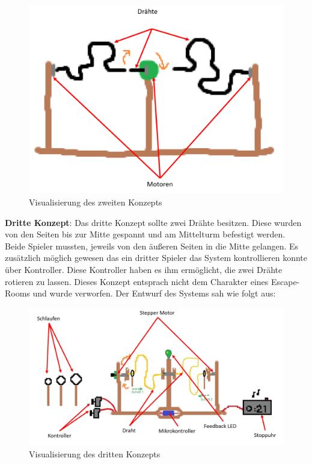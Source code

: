 \begin{figure}[H]
 \centerline{\includegraphics[width=\textwidth,scale=1]{./images/Konzeptpapier_2.png}}
 \caption{Visualisierung des zweiten Konzepts}\label{imageLabel}
\end{figure} 


\textbf{Dritte Konzept}: Das dritte Konzept sollte zwei Drähte besitzen. Diese wurden von den Seiten bis zur Mitte gespannt und am Mittelturm befestigt werden. Beide Spieler mussten, jeweils von den äußeren Seiten in die Mitte gelangen. Es zusätzlich möglich gewesen das ein dritter Spieler das System kontrollieren konnte über Kontroller. Diese Kontroller haben es ihm ermöglicht, die zwei Drähte rotieren zu lassen. Dieses Konzept entsprach nicht dem Charakter eines Escape-Rooms und wurde verworfen. Der Entwurf des Systems sah wie folgt aus: 

\begin{figure}[H]
 \centerline{\includegraphics[width=\textwidth,scale=1]{./images/Konzeptpapier_3.jpg}}
 \caption{Visualisierung des dritten Konzepts}\label{imageLabel}
\end{figure} 


